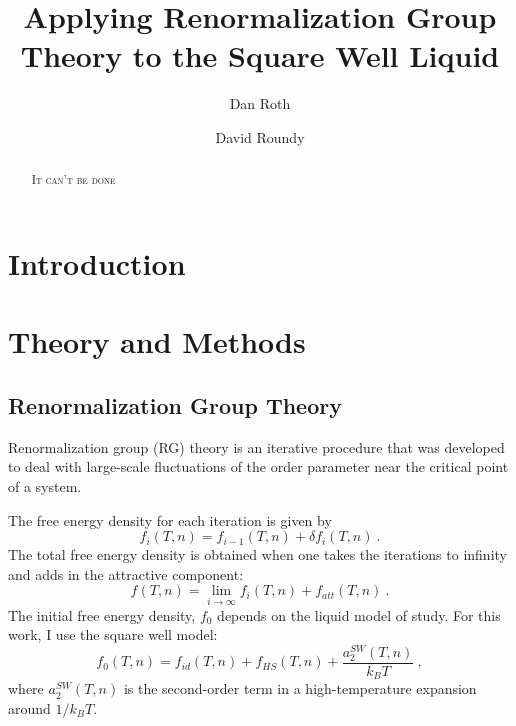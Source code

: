 \documentclass[letterpaper,twocolumn,amsmath,amssymb,prb]{revtex4-1}
\newcommand{\kT}{k_BT}
\begin{document}
\title{Applying Renormalization Group Theory to the Square Well Liquid}

\author{Dan Roth}

\author{David Roundy}

\begin{abstract}
{\textsc{It can't be done}}

\end{abstract}

\maketitle

\section{Introduction}

\section{Theory and Methods}

\subsection{Renormalization Group Theory}
Renormalization group (RG) theory is an iterative procedure that was
developed to deal with large-scale fluctuations of the order parameter
near the critical point of a system.

The free energy density for each iteration is given by
\begin{equation}
  f_i(T,n) = f_{i-1}(T,n) + \delta f_i(T,n)\ .
\end{equation}
The total free energy density is obtained when one takes the
iterations to infinity and adds in the attractive component:
\begin{equation}
  f(T,n) = \lim_{i \to \infty} f_i(T,n) + f_{att}(T,n)\ .
\end{equation}
The initial free energy density, $f_0$ depends on the liquid model of study. For this work, I use the square well model:
\begin{equation}
  f_0(T,n) = f_{id}(T,n) + f_{HS}(T,n) + \frac{a_2^{SW}(T,n)}{\kT}\ ,
\end{equation}
where $a_2^{SW}(T,n)$ is the second-order term in a high-temperature expansion around $1/\kT$.~\cite{Gil-Villegas97}
\end{document}

